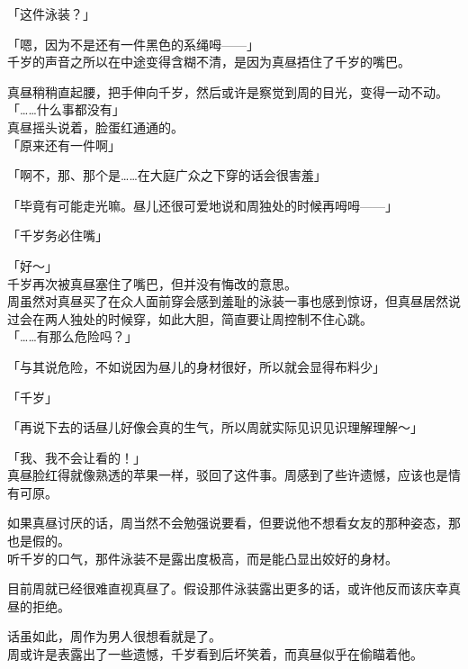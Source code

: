 「这件泳装？」

「嗯，因为不是还有一件黑色的系绳呣——」\\

千岁的声音之所以在中途变得含糊不清，是因为真昼捂住了千岁的嘴巴。

真昼稍稍直起腰，把手伸向千岁，然后或许是察觉到周的目光，变得一动不动。\\

「……什么事都没有」\\

真昼摇头说着，脸蛋红通通的。\\

「原来还有一件啊」

「啊不，那、那个是……在大庭广众之下穿的话会很害羞」

「毕竟有可能走光嘛。昼儿还很可爱地说和周独处的时候再呣呣——」

「千岁务必住嘴」

「好～」\\

千岁再次被真昼塞住了嘴巴，但并没有悔改的意思。\\

周虽然对真昼买了在众人面前穿会感到羞耻的泳装一事也感到惊讶，但真昼居然说过会在两人独处的时候穿，如此大胆，简直要让周控制不住心跳。\\

「……有那么危险吗？」

「与其说危险，不如说因为昼儿的身材很好，所以就会显得布料少」

「千岁」

「再说下去的话昼儿好像会真的生气，所以周就实际见识见识理解理解～」

「我、我不会让看的！」\\

真昼脸红得就像熟透的苹果一样，驳回了这件事。周感到了些许遗憾，应该也是情有可原。

如果真昼讨厌的话，周当然不会勉强说要看，但要说他不想看女友的那种姿态，那也是假的。\\

听千岁的口气，那件泳装不是露出度极高，而是能凸显出姣好的身材。

目前周就已经很难直视真昼了。假设那件泳装露出更多的话，或许他反而该庆幸真昼的拒绝。

话虽如此，周作为男人很想看就是了。\\

周或许是表露出了一些遗憾，千岁看到后坏笑着，而真昼似乎在偷瞄着他。\\

